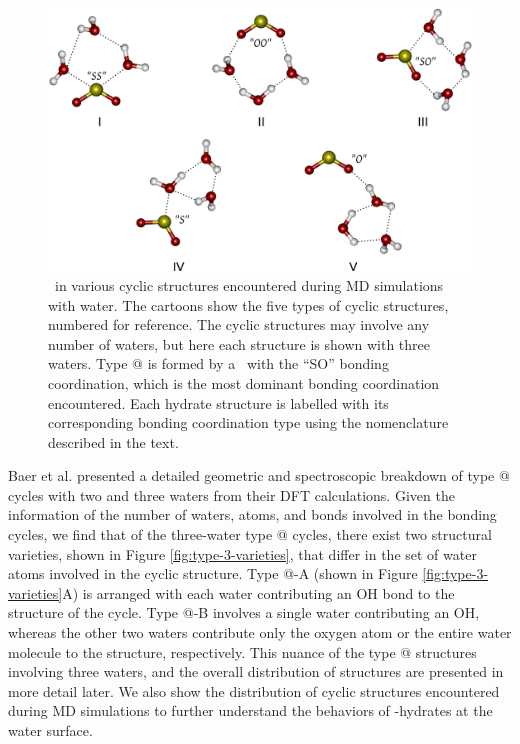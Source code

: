 \documentclass{article}
\makeatletter
\newcommand{\Rmnum}[1]{\expandafter\@slowromancap\romannumeral #1@}
\makeatother
\begin{document}
\begin{figure}[h!]
	\begin{center}
		\includegraphics[scale=1.0]{cycle-types-small.png}
		\caption{\suldiox~in various cyclic structures encountered during MD simulations with water. The cartoons show the five types of cyclic structures, numbered for reference. The cyclic structures may involve any number of waters, but here each structure is shown with three waters. Type \Rmnum{3} is formed by a \suldiox~with the ``SO'' bonding coordination, which is the most dominant bonding coordination encountered. Each hydrate structure is labelled with its corresponding bonding coordination type using the nomenclature described in the text.}
		\label{fig:cyclic-structures}
	\end{center}
\end{figure}

Baer et al. presented a detailed geometric and spectroscopic breakdown of type \Rmnum{3} cycles with two and three waters from their DFT calculations.\cite{Baer2010} Given the information of the number of waters, atoms, and bonds involved in the bonding cycles, we find that of the three-water type \Rmnum{3} cycles, there exist two structural varieties, shown in Figure \ref{fig:type-3-varieties}, that differ in the set of water atoms involved in the cyclic structure. Type \Rmnum{3}-A (shown in Figure \ref{fig:type-3-varieties}A) is arranged with each water contributing an OH bond to the structure of the cycle. Type \Rmnum{3}-B involves a single water contributing an OH, whereas the other two waters contribute only the oxygen atom or the entire water molecule to the structure, respectively. This nuance of the type \Rmnum{3} structures involving three waters, and the overall distribution of structures are presented in more detail later. We also show the distribution of cyclic structures encountered during MD simulations to further understand the behaviors of \suldiox-hydrates at the water surface.
\end{document}
